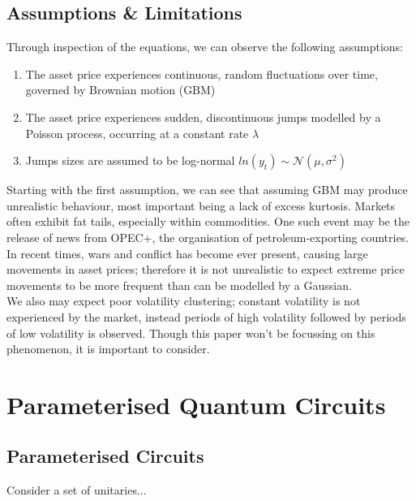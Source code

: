 \documentclass[12pt]{article}
\numberwithin{equation}{section}
\begin{document}
\subsection{Assumptions \& Limitations}
Through inspection of the equations, we can observe the following assumptions:
\begin{enumerate}
\item The asset price experiences continuous, random fluctuations over time,
  governed by Brownian motion (GBM)
\item The asset price experiences sudden, discontinuous jumps modelled by a 
  Poisson process, occurring at a constant rate $\lambda$
\item Jumps sizes are assumed to be log-normal $ln(y_t) \sim \mathcal{N}(\mu,\sigma^2)$
\end{enumerate}
Starting with the first assumption, we can see that assuming GBM may produce
unrealistic behaviour, most important being a lack of excess kurtosis.
Markets 
often exhibit fat tails, especially within commodities. One such event may 
be the release of news from OPEC+, the organisation of petroleum-exporting 
countries. In recent times, wars and conflict has become 
ever present, causing large movements in asset prices; therefore it is not 
unrealistic to
expect extreme price movements to be more frequent than can be modelled 
by a Gaussian.
\\
We also may expect poor volatility clustering; constant volatility 
is not experienced by the market, instead periods of high volatility followed 
by periods of low volatility is observed. Though this paper won't be focussing 
on this phenomenon, it is important to consider.
\\ 














\section{Parameterised Quantum Circuits}

\subsection{Parameterised Circuits}
Consider a set of unitaries... 
\end{document}
